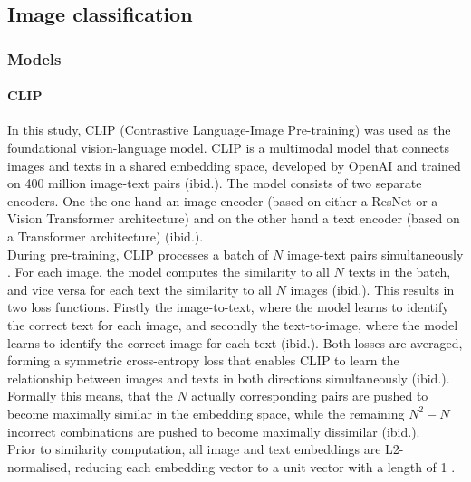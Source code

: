 \documentclass[hidelinks, 11pt]{article}
\begin{document}
\subsection{Image classification}

\subsubsection{Models}

\paragraph{CLIP}
In this study, CLIP (Contrastive Language-Image Pre-training) \citep{radford_learning_2021} was used as the foundational vision-language model. CLIP is a multimodal model that connects images and texts in a shared embedding space, developed by OpenAI and trained on 400 million image-text pairs (ibid.). The model consists of two separate encoders. One the one hand an image encoder (based on either a ResNet or a Vision Transformer architecture) and on the other hand a text encoder (based on a Transformer architecture) (ibid.).
\\
During pre-training, CLIP processes a batch of $N$ image-text pairs simultaneously \citep{radford_learning_2021}. For each image, the model computes the similarity to all $N$ texts in the batch, and vice versa for each text the similarity to all $N$ images (ibid.). This results in two loss functions. Firstly the image-to-text, where the model learns to identify the correct text for each image, and secondly the text-to-image, where the model learns to identify the correct image for each text (ibid.). Both losses are averaged, forming a symmetric cross-entropy loss that enables CLIP to learn the relationship between images and texts in both directions simultaneously (ibid.). Formally this means, that the $N$ actually corresponding pairs are pushed to become maximally similar in the embedding space, while the remaining $N^2 - N$ incorrect combinations are pushed to become maximally dissimilar (ibid.).
\\
Prior to similarity computation, all image and text embeddings are L2-normalised, reducing each embedding vector to a unit vector with a length of 1 \citep{radford_learning_2021}. 
\end{document}
